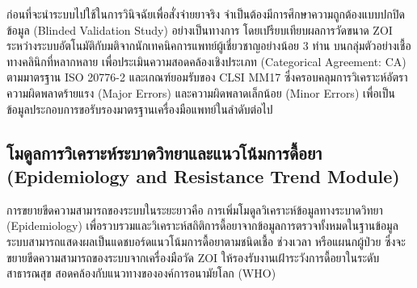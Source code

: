 ก่อนที่จะนำระบบไปใช้ในการวินิจฉัยเพื่อสั่งจ่ายยาจริง จำเป็นต้องมีการศึกษาความถูกต้องแบบปกปิดข้อมูล (Blinded Validation Study) อย่างเป็นทางการ โดยเปรียบเทียบผลการวัดขนาด ZOI ระหว่างระบบอัตโนมัติกับมติจากนักเทคนิคการแพทย์ผู้เชี่ยวชาญอย่างน้อย 3 ท่าน บนกลุ่มตัวอย่างเชื้อทางคลินิกที่หลากหลาย เพื่อประเมินความสอดคล้องเชิงประเภท (Categorical Agreement: CA) ตามมาตรฐาน ISO 20776-2 \cite{iso20776_2} และเกณฑ์ยอมรับของ CLSI MM17 \cite{clsi_mm17} ซึ่งครอบคลุมการวิเคราะห์อัตราความผิดพลาดร้ายแรง (Major Errors) และความผิดพลาดเล็กน้อย (Minor Errors) เพื่อเป็นข้อมูลประกอบการขอรับรองมาตรฐานเครื่องมือแพทย์ในลำดับต่อไป

\subsection{โมดูลการวิเคราะห์ระบาดวิทยาและแนวโน้มการดื้อยา (Epidemiology and Resistance Trend Module)}

การขยายขีดความสามารถของระบบในระยะยาวคือ การเพิ่มโมดูลวิเคราะห์ข้อมูลทางระบาดวิทยา (Epidemiology) เพื่อรวบรวมและวิเคราะห์สถิติการดื้อยาจากข้อมูลการตรวจทั้งหมดในฐานข้อมูล ระบบสามารถแสดงผลเป็นแดชบอร์ดแนวโน้มการดื้อยาตามชนิดเชื้อ ช่วงเวลา หรือแผนกผู้ป่วย ซึ่งจะขยายขีดความสามารถของระบบจากเครื่องมือวัด ZOI ให้รองรับงานเฝ้าระวังการดื้อยาในระดับสาธารณสุข สอดคล้องกับแนวทางขององค์การอนามัยโลก (WHO) \cite{who_amr2022}
